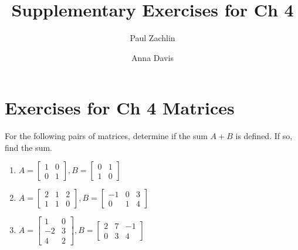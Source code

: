 \documentclass{ximera}
\author{Paul Zachlin \and Anna Davis} \title{Supplementary Exercises for Ch 4} \license{CC-BY 4.0}
\begin{document}
\begin{abstract}
\end{abstract}
\maketitle

\section*{Exercises for Ch 4 Matrices}

\begin{problem}\label{prb:4.1} For the following pairs of matrices, determine if the sum $A + B$ is defined. If so, find the sum.
\begin{enumerate}
\item
$A = \left[ \begin{array}{rr}
1 & 0 \\
0 & 1
\end{array} \right],
B = \left[ \begin{array}{rr}
0 & 1 \\
1 & 0
\end{array} \right]$

\item
$A = \left[ \begin{array}{rrr}
2 & 1 & 2 \\
1 & 1 & 0
\end{array} \right],  B = \left[ \begin{array}{rrr}
-1 & 0 & 3\\
0 & 1 & 4
\end{array} \right]$

\item
$A = \left[ \begin{array}{rr}
1 & 0 \\
-2 & 3 \\
4 & 2
\end{array} \right], B = \left[ \begin{array}{rrr}
2 & 7 & -1 \\
0 & 3 & 4
\end{array} \right]$
\end{enumerate}
\end{problem}
\end{document}
